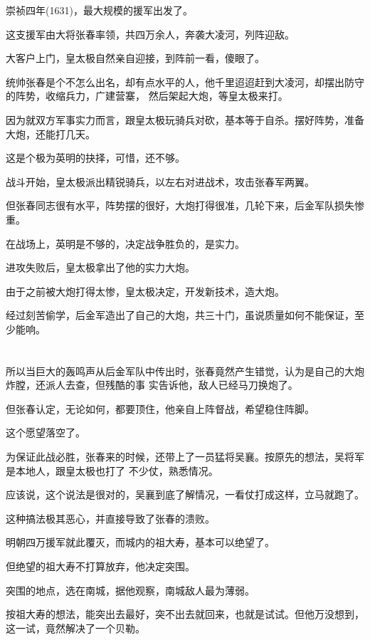 \documentclass[11pt,a4paper,onecolumn]{article}
\begin{document}
崇祯四年(1631)，最大规模的援军出发了。

这支援军由大将张春率领，共四万余人，奔袭大凌河，列阵迎敌。

大客户上门，皇太极自然亲自迎接，到阵前一看，傻眼了。

统帅张春是个不怎么出名，却有点水平的人，他千里迢迢赶到大凌河，却摆出防守的阵势，收缩兵力，广建营寨，
然后架起大炮，等皇太极来打。

因为就双方军事实力而言，跟皇太极玩骑兵对砍，基本等于自杀。摆好阵势，准备大炮，还能打几天。

这是个极为英明的抉择，可惜，还不够。

战斗开始，皇太极派出精锐骑兵，以左右对进战术，攻击张春军两翼。

但张春同志很有水平，阵势摆的很好，大炮打得很准，几轮下来，后金军队损失惨重。

在战场上，英明是不够的，决定战争胜负的，是实力。

进攻失败后，皇太极拿出了他的实力\myrule 大炮。

由于之前被大炮打得太惨，皇太极决定，开发新技术，造大炮。

经过刻苦偷学，后金军造出了自己的大炮，共三十门，虽说质量如何不能保证，至少能响。

\section[\thesection]{}

所以当巨大的轰鸣声从后金军队中传出时，张春竟然产生错觉，认为是自己的大炮炸膛，还派人去查，但残酷的事
实告诉他，敌人已经马刀换炮了。

但张春认定，无论如何，都要顶住，他亲自上阵督战，希望稳住阵脚。

这个愿望落空了。

为保证此战必胜，张春来的时候，还带上了一员猛将\myrule 吴襄。按原先的想法，吴将军是本地人，跟皇太极也打了
不少仗，熟悉情况。

应该说，这个说法是很对的，吴襄到底了解情况，一看仗打成这样，立马就跑了。

这种搞法极其恶心，并直接导致了张春的溃败。

明朝四万援军就此覆灭，而城内的祖大寿，基本可以绝望了。

但绝望的祖大寿不打算放弃，他决定突围。

突围的地点，选在南城，据他观察，南城敌人最为薄弱。

按祖大寿的想法，能突出去最好，突不出去就回来，也就是试试。但他万没想到，这一试，竟然解决了一个贝勒。
\end{document}
